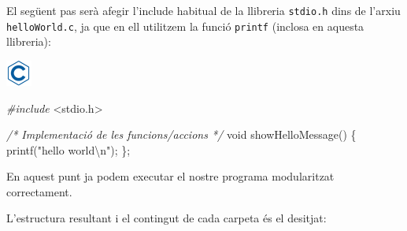 \documentclass[]{book}
\newenvironment{Shaded}{\begin{snugshade}}{\end{snugshade}}
\newcommand{\DataTypeTok}[1]{\textcolor[rgb]{0.13,0.29,0.53}{#1}}
\newcommand{\SpecialCharTok}[1]{\textcolor[rgb]{0.00,0.00,0.00}{#1}}
\newcommand{\StringTok}[1]{\textcolor[rgb]{0.31,0.60,0.02}{#1}}
\newcommand{\ImportTok}[1]{#1}
\newcommand{\CommentTok}[1]{\textcolor[rgb]{0.56,0.35,0.01}{\textit{#1}}}
\newcommand{\PreprocessorTok}[1]{\textcolor[rgb]{0.56,0.35,0.01}{\textit{#1}}}
\newcommand{\NormalTok}[1]{#1}
\begin{document}
El següent pas serà afegir l'include habitual de la llibreria
\texttt{stdio.h} dins de l'arxiu \texttt{helloWorld.c}, ja que en ell
utilitzem la funció \texttt{printf} (inclosa en aquesta llibreria):

\includegraphics{./img/c.png}

\begin{Shaded}
\begin{Highlighting}[]
\PreprocessorTok{#include }\ImportTok{<stdio.h>}

\CommentTok{/* Implementació de les funcions/accions */}
\DataTypeTok{void}\NormalTok{ showHelloMessage() \{}
\NormalTok{    printf(}\StringTok{"hello world}\SpecialCharTok{\textbackslash{}n}\StringTok{"}\NormalTok{);}
\NormalTok{\};}
\end{Highlighting}
\end{Shaded}

En aquest punt ja podem executar el nostre programa modularitzat
correctament.

L'estructura resultant i el contingut de cada carpeta és el desitjat:
\end{document}
